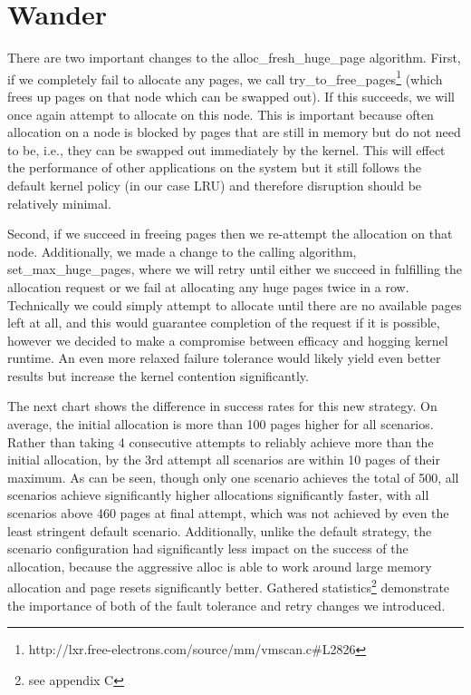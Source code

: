\documentclass{article}
\begin{document}
\section{Wander}
There are two important changes to the alloc\_fresh\_huge\_page algorithm. First, if we completely fail to allocate any pages, we call try\_to\_free\_pages\footnote{http://lxr.free-electrons.com/source/mm/vmscan.c\#L2826} (which frees up pages on that node which can be swapped out). If this succeeds, we will once again attempt to allocate on this node. This is important because often allocation on a node is blocked by pages that are still in memory but do not need to be, i.e., they can be swapped out immediately by the kernel. This will effect the performance of other applications on the system but it still follows the default kernel policy (in our case LRU) and therefore disruption should be relatively minimal.

\begin{figure}[H]

\label{figure:Aggressive alloc_fresh_huge_page}
\end{figure}

Second, if we succeed in freeing pages then we re-attempt the allocation on that node. Additionally, we made a change to the calling algorithm, set\_max\_huge\_pages, where we will retry until either we succeed in fulfilling the allocation request or we fail at allocating any huge pages twice in a row. Technically we could simply attempt to allocate until there are no available pages left at all, and this would guarantee completion of the request if it is possible, however we decided to make a compromise between efficacy and hogging kernel runtime. An even more relaxed failure tolerance would likely yield even better results but increase the kernel contention significantly.

\begin{figure}[H]

\label{figure:Aggressive alloc_fresh_huge_page}
\end{figure}

The next chart shows the difference in success rates for this new strategy. On average, the initial allocation is more than 100 pages higher for all scenarios. Rather than taking 4 consecutive attempts to reliably achieve more than the initial allocation, by the 3rd attempt all scenarios are within 10 pages of their maximum. As can be seen, though only one scenario achieves the total of 500, all scenarios achieve significantly higher allocations significantly faster, with all scenarios above 460 pages at final attempt, which was not achieved by even the least stringent default scenario. Additionally, unlike the default strategy, the scenario configuration had significantly less impact on the success of the allocation, because the aggressive alloc is able to work around large memory allocation and page resets significantly better.  Gathered statistics\footnote{see appendix C} demonstrate the importance of both of the fault tolerance and retry changes we introduced.
\end{document}
